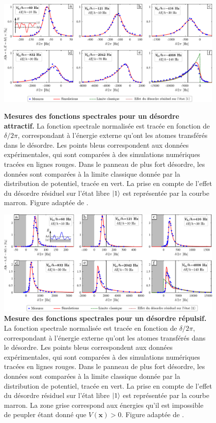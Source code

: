 \begin{figure}
\centering
\includegraphics[width=\textwidth]{Fig/TauS_NJP/fonctions_spectrales_rouge.pdf}
\caption{\textbf{Mesures des fonctions spectrales pour un désordre attractif.} La fonction spectrale normalisée est tracée en fonction de $\delta/2\pi$, correspondant à l'énergie externe qu'ont les atomes transférés dans le désordre. Les points bleus correspondent aux données expérimentales, qui sont comparées à des simulations numériques tracées en lignes rouges. Dans le panneau de plus fort désordre, les données sont comparées à la limite classique donnée par la distribution de potentiel, tracée en vert. La prise en compte de l'effet du désordre résiduel sur l'état libre $\left| 1 \right\rangle$ est représentée par la courbe marron. Figure adaptée de \citep{denechaud2018vers}.}
\label{fig:mesures_fonctions_spectrales_rouge}

\vspace{1cm}
\includegraphics[width=\textwidth]{Fig/TauS_NJP/fonctions_spectrales_bleu.pdf}
\caption{\textbf{Mesure des fonctions spectrales pour un désordre répulsif.} La fonction spectrale normalisée est tracée en fonction de $\delta/2\pi$, correspondant à l'énergie externe qu'ont les atomes transférés dans le désordre. Les points bleus correspondent aux données expérimentales, qui sont comparées à des simulations numériques tracées en lignes rouges. Dans le panneau de plus fort désordre, les données sont comparées à la limite classique donnée par la distribution de potentiel, tracée en vert. La prise en compte de l'effet du désordre résiduel sur l'état libre $\left| 1 \right\rangle$ est représentée par la courbe marron. La zone grise correspond aux énergies qu'il est impossible de peupler étant donné que $V(\mathbf{x})>0$. Figure adaptée de \citep{denechaud2018vers}.}
\label{fig:mesures_fonctions_spectrales_bleu}
\end{figure}

